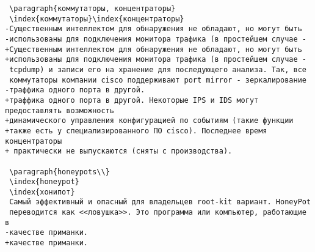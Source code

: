 \begin{verbatim}
 \paragraph{коммутаторы, концентраторы}
 \index{коммутаторы}\index{концентраторы}
-Существенным интеллектом для обнаружения не обладают, но могут быть
-использованы для подключения монитора трафика (в простейшем случае -
+Существенным интеллектом для обнаружения не обладают, но могут быть
+использованы для подключения монитора трафика (в простейшем случае -
 tcpdump) и записи его на хранение для последующего анализа. Так, все
 коммутаторы компании cisco поддерживают port mirror - зеркалирование
-траффика одного порта в другой.
+траффика одного порта в другой. Некоторые IPS и IDS могут предоставлять возможность
+динамического управления конфигурацией по событиям (такие функции
+также есть у специализированного ПО cisco). Последнее время концентраторы
+ практически не выпускаются (сняты с производства).

 \paragraph{honeypots\\}
 \index{honeypot}
 \index{хонипот}
 Самый эффективный и опасный для владельцев root-kit вариант. HoneyPot
 переводится как <<ловушка>>. Это программа или компьютер, работающие в
-качестве приманки.
+качестве приманки.


\end{verbatim}
